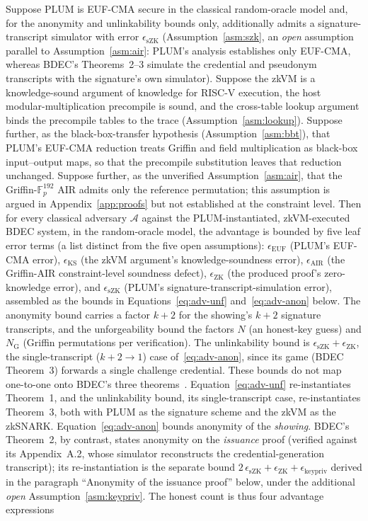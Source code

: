 \begin{theorem}\label{thm:security-preserve}
    Suppose PLUM is EUF-CMA secure in the classical random-oracle model and, for the anonymity and unlinkability bounds only, additionally admits a signature-transcript simulator with error $\epsilon_{\mathrm{sZK}}$ (Assumption~\ref{asm:szk}, an \emph{open} assumption parallel to Assumption~\ref{asm:air}: PLUM's analysis establishes only EUF-CMA, whereas BDEC's Theorems~2--3 simulate the credential and pseudonym transcripts with the signature's own simulator). Suppose the zkVM is a knowledge-sound argument of knowledge for RISC-V execution, the host modular-multiplication precompile is sound, and the cross-table lookup argument binds the precompile tables to the trace (Assumption~\ref{asm:lookup}). Suppose further, as the black-box-transfer hypothesis (Assumption~\ref{asm:bbt}), that PLUM's EUF-CMA reduction treats Griffin and field multiplication as black-box input--output maps, so that the precompile substitution leaves that reduction unchanged. Suppose further, as the unverified Assumption~\ref{asm:air}, that the Griffin-$\mathbb{F}_p^{192}$ AIR admits only the reference permutation; this assumption is argued in Appendix~\ref{app:proofs} but not established at the constraint level. Then for every classical adversary $\mathcal{A}$ against the PLUM-instantiated, zkVM-executed BDEC system, in the random-oracle model, the advantage is bounded by five leaf error terms (a list distinct from the five open assumptions): $\epsilon_{\mathrm{EUF}}$ (PLUM's EUF-CMA error), $\epsilon_{\mathrm{KS}}$ (the zkVM argument's knowledge-soundness error), $\epsilon_{\mathrm{AIR}}$ (the Griffin-AIR constraint-level soundness defect), $\epsilon_{\mathrm{ZK}}$ (the produced proof's zero-knowledge error), and $\epsilon_{\mathrm{sZK}}$ (PLUM's signature-transcript-simulation error), assembled as the bounds in Equations~\eqref{eq:adv-unf} and~\eqref{eq:adv-anon} below. The anonymity bound carries a factor $k+2$ for the showing's $k+2$ signature transcripts, and the unforgeability bound the factors $N$ (an honest-key guess) and $N_{\mathrm G}$ (Griffin permutations per verification). The unlinkability bound is $\epsilon_{\mathrm{sZK}}+\epsilon_{\mathrm{ZK}}$, the single-transcript ($k+2\to1$) case of~\eqref{eq:adv-anon}, since its game (BDEC Theorem~3) forwards a single challenge credential. These bounds do not map one-to-one onto BDEC's three theorems~\cite{10.1007/978-981-96-0957-4_3}. Equation~\eqref{eq:adv-unf} re-instantiates Theorem~1, and the unlinkability bound, its single-transcript case, re-instantiates Theorem~3, both with PLUM as the signature scheme and the zkVM as the zkSNARK. Equation~\eqref{eq:adv-anon} bounds anonymity of the \emph{showing}. BDEC's Theorem~2, by contrast, states anonymity on the \emph{issuance} proof (verified against its Appendix~A.2, whose simulator reconstructs the credential-generation transcript); its re-instantiation is the separate bound $2\,\epsilon_{\mathrm{sZK}}+\epsilon_{\mathrm{ZK}}+\epsilon_{\mathrm{keypriv}}$ derived in the paragraph ``Anonymity of the issuance proof'' below, under the additional \emph{open} Assumption~\ref{asm:keypriv}. The honest count is thus four advantage expressions 
\end{theorem}
